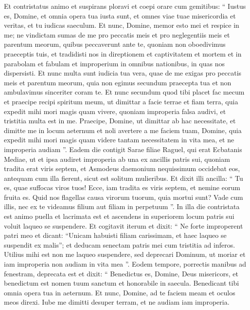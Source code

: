 \begin{biblechapter}
\begin{biblechapter}
\begin{biblechapter}
\verse Et contristatus animo et suspirans ploravi et coepi orare cum gemitibus: 
\verse “ Iustus es, Domine, et omnia opera tua iusta sunt, et omnes viae tuae misericordia et veritas, et tu iudicas saeculum. 
\verse Et nunc, Domine, memor esto mei et respice in me; ne vindictam sumas de me pro peccatis meis et pro neglegentiis meis et parentum meorum, quibus peccaverunt ante te, 
\verse quoniam non oboedivimus praeceptis tuis, et tradidisti nos in direptionem et captivitatem et mortem et in parabolam et fabulam et improperium in omnibus nationibus, in quas nos dispersisti. 
\verse Et nunc multa sunt iudicia tua vera, quae de me exigas pro peccatis meis et parentum meorum, quia non egimus secundum praecepta tua et non ambulavimus sinceriter coram te. 
\verse Et nunc secundum quod tibi placet fac mecum et praecipe recipi spiritum meum, ut dimittar a facie terrae et fiam terra, quia expedit mihi mori magis quam vivere, quoniam improperia falsa audivi, et tristitia multa est in me. Praecipe, Domine, ut dimittar ab hac necessitate, et dimitte me in locum aeternum et noli avertere a me faciem tuam, Domine, quia expedit mihi mori magis quam videre tantam necessitatem in vita mea, et ne improperia audiam ”.
 \verse Eadem die contigit Sarae filiae Raguel, qui erat Ecbatanis Mediae, ut et ipsa audiret improperia ab una ex ancillis patris sui, 
\verse quoniam tradita erat viris septem, et Asmodeus daemonium nequissimum occidebat eos, antequam cum illa fierent, sicut est solitum mulieribus. Et dixit illi ancilla: “ Tu es, quae suffocas viros tuos! Ecce, iam tradita es viris septem, et nemine eorum fruita es. 
\verse Quid nos flagellas causa virorum tuorum, quia mortui sunt? Vade cum illis, nec ex te videamus filium aut filiam in perpetuum ”. 
\verse In illa die contristata est animo puella et lacrimata est et ascendens in superiorem locum patris sui voluit laqueo se suspendere. Et cogitavit iterum et dixit: “ Ne forte improperent patri meo et dicant: “Unicam habuisti filiam carissimam, et haec laqueo se suspendit ex malis”; et deducam senectam patris mei cum tristitia ad inferos. Utilius mihi est non me laqueo suspendere, sed deprecari Dominum, ut moriar et iam improperia non audiam in vita mea ”. 
\verse Eodem tempore, porrectis manibus ad fenestram, deprecata est et dixit: “ Benedictus es, Domine, Deus misericors, et benedictum est nomen tuum sanctum et honorabile in saecula. Benedicant tibi omnia opera tua in aeternum. 
\verse Et nunc, Domine, ad te faciem meam et oculos meos direxi. 
\verse Iube me dimitti desuper terram, et ne audiam iam improperia. 

\end{biblechapter}
\end{biblechapter}
\end{biblechapter}
